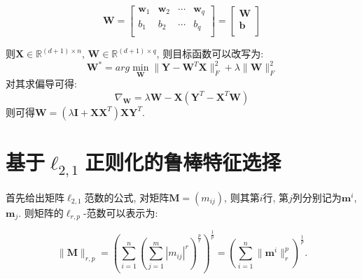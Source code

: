 \documentclass[lang=cn,10pt]{gorgeousnbook}
\numberwithin{equation}{section}%
\numberwithin{figure}{section}%
\begin{document}
 \begin{equation}
\mathbf{W}=\left[ \begin{matrix}
	\mathbf{w}_1&		\mathbf{w}_2&		\cdots&		\mathbf{w}_q\\
	b_1&		b_2&		\cdots&		b_q\\
\end{matrix} \right] =\left[ \begin{array}{c}
	\mathbf{W}\\
	\mathbf{b}\\
\end{array} \right]  \nonumber
\end{equation}

则$\mathbf{X}\in \mathbb{R}^{(d+1)\times n}$, $\mathbf{W}\in \mathbb{R}^{(d+1)\times q}$, 则目标函数可以改写为:
 \begin{equation}
\mathbf{W}^*=arg\min_{\mathbf{W}}\lVert \mathbf{Y}-\mathbf{W}^T\mathbf{X}\rVert _{F}^{2}+\lambda \lVert \mathbf{W} \rVert _{F}^{2}
\end{equation}
对其求偏导可得:
 \begin{equation}
\nabla _{\mathbf{W}}=\lambda \mathbf{W}-\mathbf{X}\left( \mathbf{Y}^T-\mathbf{X}^T\mathbf{W} \right) 
\end{equation}
则可得$\mathbf{W}=\left( \lambda \mathbf{I}+\mathbf{XX}^T \right) \mathbf{XY}^T$.  

\section{基于$\ell_{2,1}$正则化的鲁棒特征选择}
首先给出矩阵$\ell_{2,1}$范数的公式, 对矩阵$\mathbf{M}=\left( m_{ij} \right) $, 则其第$i$行, 第$j$列分别记为$\mathbf{m}^i$, $\mathbf{m}_j$. 则矩阵的$\ell_{r,p}$-范数可以表示为:

 \begin{equation}
\lVert \mathbf{M} \rVert _{r,p}=\left( \sum_{i=1}^n{\left( \sum_{j=1}^m{\left| m_{ij} \right|^r} \right) ^{\frac{p}{r}}} \right) ^{\frac{1}{p}}=\left( \sum_{i=1}^n{\lVert \mathbf{m}^i \rVert _{r}^{p}} \right) ^{\frac{1}{p}}.
\end{equation}
\end{document}
